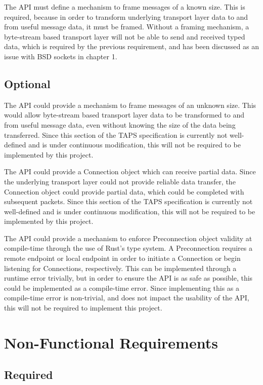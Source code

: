 \documentclass{l4proj}
\begin{document}
The API must define a mechanism to frame messages of a known size.
This is required, because in order to transform underlying transport layer data to and from useful message data,
it must be framed.
Without a framing mechanism, a byte-stream based transport layer will not be able to send and received typed data,
which is required by the previous requirement, and has been discussed as an issue with BSD sockets in chapter 1.

\subsection{Optional}\label{subsec:optional}

The API could provide a mechanism to frame messages of an unknown size.
This would allow byte-stream based transport layer data to be transformed to and from useful message data, even without
knowing the size of the data being transferred.
Since this section of the TAPS specification is currently not well-defined and is under continuous modification,
this will not be required to be implemented by this project.

The API could provide a Connection object which can receive partial data.
Since the underlying transport layer could not provide reliable data transfer, the Connection object could provide
partial data, which could be completed with subsequent packets.
Since this section of the TAPS specification is currently not well-defined and is under continuous modification, this
will not be required to be implemented by this project.

The API could provide a mechanism to enforce Preconnection object validity at compile-time through the use of Rust's
type system.
A Preconnection requires a remote endpoint or local endpoint in order to initiate a Connection or begin listening for
Connections, respectively.
This can be implemented through a runtime error trivially, but in order to ensure the API is as safe as possible, this
could be implemented as a compile-time error.
Since implementing this as a compile-time error is non-trivial, and does not impact the usability of the API, this will
not be required to implement this project.

\section{Non-Functional Requirements}\label{sec:non-functional-requirements}

\subsection{Required}\label{subsec:required2}
\end{document}

